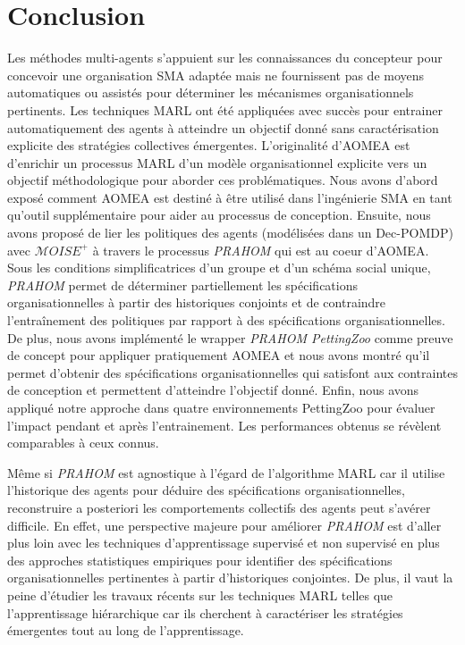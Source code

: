 \documentclass[contribution]{jfsma}
\begin{document}
\section{Conclusion}

Les méthodes multi-agents s'appuient sur les connaissances du concepteur pour concevoir une organisation SMA adaptée mais ne fournissent pas de moyens automatiques ou assistés pour déterminer les mécanismes organisationnels pertinents.
Les techniques MARL ont été appliquées avec succès pour entrainer automatiquement des agents à atteindre un objectif donné sans caractérisation explicite des stratégies collectives émergentes.
L'originalité d'AOMEA est d'enrichir un processus MARL d'un modèle organisationnel explicite vers un objectif méthodologique pour aborder ces problématiques. Nous avons d'abord exposé comment AOMEA est destiné à être utilisé dans l'ingénierie SMA en tant qu'outil supplémentaire pour aider au processus de conception.
Ensuite, nous avons proposé de lier les politiques des agents (modélisées dans un Dec-POMDP) avec $\mathcal{M}OISE^+$ à travers le processus \emph{PRAHOM} qui est au coeur d'AOMEA. Sous les conditions simplificatrices d'un groupe et d'un schéma social unique, \emph{PRAHOM} permet de déterminer partiellement les spécifications organisationnelles à partir des historiques conjoints et de contraindre l'entraînement des politiques par rapport à des spécifications organisationnelles.
De plus, nous avons implémenté le wrapper \emph{PRAHOM PettingZoo} comme preuve de concept pour appliquer pratiquement AOMEA et nous avons montré qu'il permet d'obtenir des spécifications organisationnelles qui satisfont aux contraintes de conception et permettent d'atteindre l'objectif donné.
Enfin, nous avons appliqué notre approche dans quatre environnements PettingZoo pour évaluer l'impact pendant et après l'entrainement. Les performances obtenus se révèlent comparables à ceux connus.

Même si \emph{PRAHOM} est agnostique à l'égard de l'algorithme MARL car il utilise l'historique des agents pour déduire des spécifications organisationnelles, reconstruire a posteriori les comportements collectifs des agents peut s'avérer difficile. En effet, une perspective majeure pour améliorer \emph{PRAHOM} est d'aller plus loin avec les techniques d'apprentissage supervisé et non supervisé en plus des approches statistiques empiriques pour identifier des spécifications organisationnelles pertinentes à partir d'historiques conjointes. De plus, il vaut la peine d’étudier les travaux récents sur les techniques MARL telles que l’apprentissage hiérarchique car ils cherchent  à caractériser les stratégies émergentes tout au long de l’apprentissage.
\end{document}
